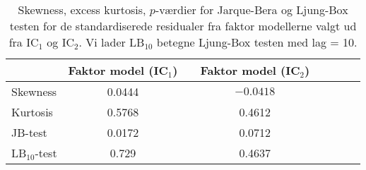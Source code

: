 \begin{table}
\center
\begin{tabular}{lccccccc} \toprule
& Faktor model (IC$_1$) & & Faktor model (IC$_2$)  \\ \midrule
Skewness & 0.0444 & & $-0.0418$     \\
Kurtosis & 0.5768 & & 0.4612 \\
JB-test & 0.0172 & & 0.0712 \\ 
LB$_{10}$-test & 0.729  && 0.4637  \\ \bottomrule
\end{tabular}
\caption{Skewness, excess kurtosis, $p$-værdier for Jarque-Bera og Ljung-Box testen for de standardiserede residualer fra faktor modellerne valgt ud fra IC$_1$ og IC$_2$. 
Vi lader LB$_{10}$ betegne Ljung-Box testen med lag = 10. } \label{tab:test_faktor}
\end{table}